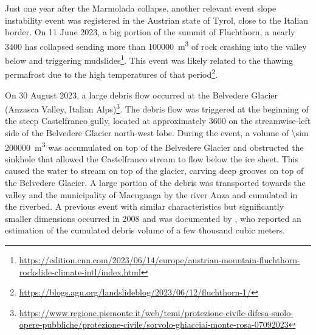 Just one year after the Marmolada collapse, another relevant event slope instability event was registered in the Austrian state of Tyrol, close to the Italian border. 
On 11 June 2023, a big portion of the summit of Fluchthorn, a nearly \SI{3400}{\masl} has collapsed sending more than \SI{100000}{\cubic\meter} of rock crashing into the valley below and triggering mudslides\footnote{\mbox{\url{https://edition.cnn.com/2023/06/14/europe/austrian-mountain-fluchthorn-rockslide-climate-intl/index.html}}}.
This event was likely related to the thawing permafrost due to the high temperatures of that period\footnote{\url{https://blogs.agu.org/landslideblog/2023/06/12/fluchthorn-1/}}.

On 30 August 2023, a large debris flow occurred at the Belvedere Glacier
(Anzasca Valley, Italian Alps)\footnote{\url{https://www.regione.piemonte.it/web/temi/protezione-civile-difesa-suolo-opere-pubbliche/protezione-civile/sorvolo-ghiacciai-monte-rosa-07092023}}.
The debris flow was triggered at the beginning of the steep Castelfranco gully, located at approximately \SI{3600}{\masl} on the streamwise-left side of the Belvedere Glacier north-west lobe.
During the event, a volume of \SI{\sim 200000}{\cubic\meter} was accumulated on top of the Belvedere Glacier and obstructed the sinkhole that allowed the Castelfranco stream to flow below the ice sheet. 
This caused the water to stream on top of the glacier, carving deep grooves on top of the Belvedere Glacier. 
A large portion of the debris was transported towards the valley and the municipality of Macugnaga by the river Anza and cumulated in the riverbed.
A previous event with similar characteristics but significantly smaller dimensions occurred in 2008 and was documented by \cite{Mortara2009}, who reported an estimation of the cumulated debris volume of a few thousand cubic meters.

